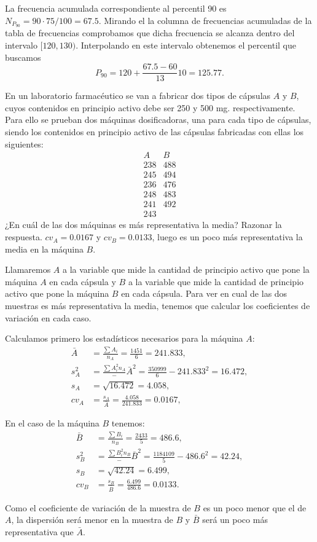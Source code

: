 {\begin{enumerate}
La frecuencia acumulada correspondiente al percentil 90 es $N_{P_{90}}=90\cdot 75/100=67.5$. Mirando el la  columna de frecuencias acumuladas de la tabla de frecuencias comprobamos que dicha frecuencia se alcanza dentro del intervalo $[120,130)$.
Interpolando en este intervalo obtenemos el percentil que buscamos \[P_{90}=120+\frac{67.5-60}{13}10=125.77.\]
\end{enumerate}
}


{En un laboratorio farmacéutico se van a fabricar dos tipos de cápsulas $A$ y $B$, cuyos contenidos en principio
activo debe ser 250 y 500 mg. respectivamente. Para ello se prueban dos máquinas dosificadoras, una para cada tipo de
cápsulas, siendo los contenidos en principio activo de las cápsulas fabricadas con ellas los siguientes:
\[
\begin{array}{c|c}
A & B  \\ \hline
238 & 488  \\
245 & 494  \\
236 & 476  \\
248 & 483  \\
241 & 492  \\
243 &
\end{array}
 \]
¿En cuál de las dos máquinas es más representativa la media?
Razonar la respuesta.
}
{$cv_{A} = 0.0167$ y $cv_{B}=0.0133$, luego es un poco más representativa la media en la máquina $B$.
}
{Llamaremos $A$ a la variable que mide la cantidad de principio activo que pone la máquina $A$ en cada cápsula y $B$ a la variable que mide la cantidad de principio activo que pone la máquina $B$ en cada cápsula.
Para ver en cual de las dos muestras es más representativa la media, tenemos que calcular los coeficientes de variación en cada caso.

Calculamos primero los estadísticos necesarios para la máquina $A$:
\begin{align*}
\bar{A} & = \frac{\sum A_{i}}{n_{A}}=\frac{1451}{6}=241.833,\\
s_{A}^2 & =  \frac{\sum{A_{i}^2}{n_{A}}}-\bar{A}^2= \frac{350999}{6}-241.833^2=16.472,\\
s_{A} & = \sqrt{16.472}= 4.058,\\
cv_{A} & = \frac{s_{A}}{\bar{A}}=\frac{4.058}{241.833}=0.0167,
\end{align*}

En el caso de la máquina $B$ tenemos:
\begin{align*}
\bar{B} & = \frac{\sum B_{i}}{n_{B}}=\frac{2433}{5}=486.6,\\
s_{B}^2 & = \frac{\sum{B_{i}^2}{n_{B}}}-\bar{B}^2= \frac{1184109}{5}-486.6^2=42.24,\\
s_{B} & = \sqrt{42.24}= 6.499,\\
cv_{B} & = \frac{s_{B}}{\bar{B}}=\frac{6.499}{486.6}=0.0133.
\end{align*}

Como el coeficiente de variación de la muestra de $B$ es un poco menor que el de $A$, la dispersión será menor en la muestra de $B$ y $\bar{B}$ será un poco más representativa que $\bar{A}$.
}


